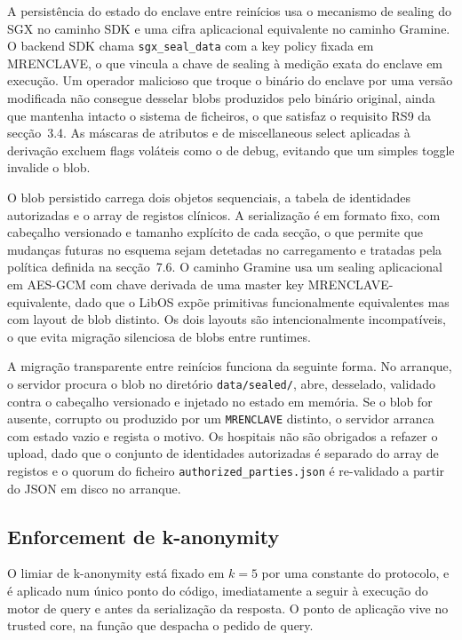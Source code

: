 A persistência do estado do enclave entre reinícios usa o mecanismo de sealing do SGX no caminho SDK e uma cifra aplicacional equivalente no caminho Gramine. O backend SDK chama \texttt{sgx\_seal\_data} com a key policy fixada em MRENCLAVE, o que vincula a chave de sealing à medição exata do enclave em execução. Um operador malicioso que troque o binário do enclave por uma versão modificada não consegue desselar blobs produzidos pelo binário original, ainda que mantenha intacto o sistema de ficheiros, o que satisfaz o requisito RS9 da secção~3.4. As máscaras de atributos e de miscellaneous select aplicadas à derivação excluem flags voláteis como o de debug, evitando que um simples toggle invalide o blob.

O blob persistido carrega dois objetos sequenciais, a tabela de identidades autorizadas e o array de registos clínicos. A serialização é em formato fixo, com cabeçalho versionado e tamanho explícito de cada secção, o que permite que mudanças futuras no esquema sejam detetadas no carregamento e tratadas pela política definida na secção~7.6. O caminho Gramine usa um sealing aplicacional em AES-GCM com chave derivada de uma master key MRENCLAVE-equivalente, dado que o LibOS expõe primitivas funcionalmente equivalentes mas com layout de blob distinto. Os dois layouts são intencionalmente incompatíveis, o que evita migração silenciosa de blobs entre runtimes.

A migração transparente entre reinícios funciona da seguinte forma. No arranque, o servidor procura o blob no diretório \texttt{data/sealed/}, abre, desselado, validado contra o cabeçalho versionado e injetado no estado em memória. Se o blob for ausente, corrupto ou produzido por um \texttt{MRENCLAVE} distinto, o servidor arranca com estado vazio e regista o motivo. Os hospitais não são obrigados a refazer o upload, dado que o conjunto de identidades autorizadas é separado do array de registos e o quorum do ficheiro \texttt{authorized\_parties.json} é re-validado a partir do JSON em disco no arranque.

\subsection{Enforcement de k-anonymity}

O limiar de k-anonymity está fixado em $k=5$ por uma constante do protocolo, e é aplicado num único ponto do código, imediatamente a seguir à execução do motor de query e antes da serialização da resposta. O ponto de aplicação vive no trusted core, na função que despacha o pedido de query.

